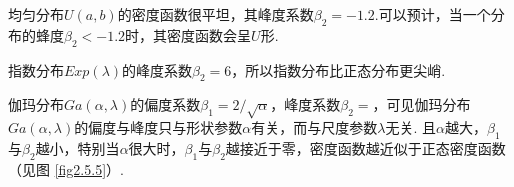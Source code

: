 \begin{example}
  \begin{inparaenum}[(1)]
    \item 均匀分布$U(a,b)$的密度函数很平坦，其峰度系数$\beta_2=-1.2$.可以预计，当一个分布的蜂度$\beta_2<-1.2$时，其密度函数会呈$U$形.

    \item 指数分布$Exp(\lambda)$的峰度系数$\beta_2=6$，所以指数分布比正态分布更尖峭.

    \item 伽玛分布$Ga(\alpha,\lambda)$的偏度系数$\beta_1=2/\sqrt\alpha$，峰度系数$\beta_2=$，可见伽玛分布$Ga(\alpha,\lambda)$的偏度与峰度只与形状参数$\alpha$有关，而与尺度参数$\lambda$无关. 且$\alpha$越大，$\beta_1$与$\beta_2$越小，特别当$\alpha$很大时，$\beta_1$与$\beta_2$越接近于零，密度函数越近似于正态密度函数（见图 \ref{fig2.5.5}）.
  \end{inparaenum}
\end{example}

